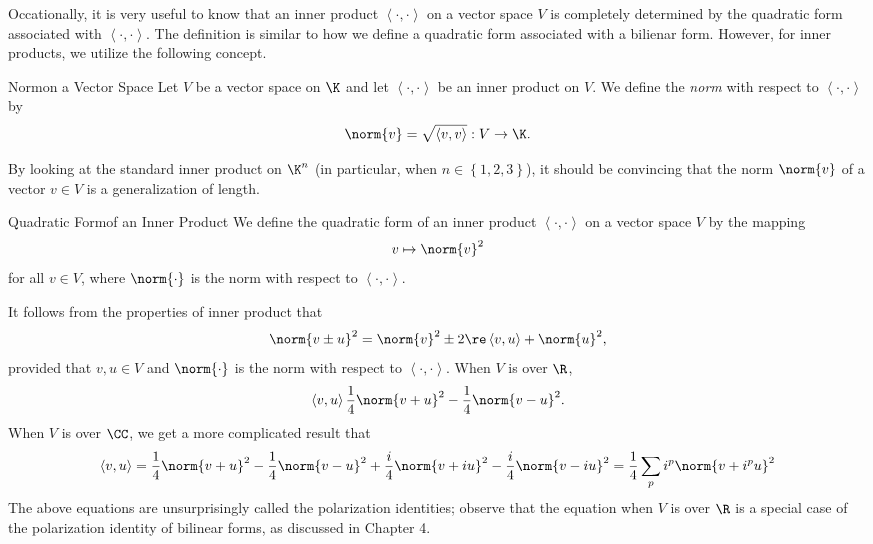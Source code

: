 \documentclass[linearalgebraII]{subfiles}
\begin{document}
    \begin{remark}
        Occationally, it is very useful to know that an inner product $\left\langle \cdot, \cdot\right\rangle$ on a vector space $V$ is completely determined by the quadratic form associated with $\left\langle \cdot, \cdot\right\rangle$. The definition is similar to how we define a quadratic form associated with a bilienar form. However, for inner products, we utilize the following concept.
    \end{remark}

    \begin{definition}{Norm}{on a Vector Space}
        Let $V$ be a vector space on $\K$ and let $\left\langle \cdot, \cdot\right\rangle$ be an inner product on $V$. We define the \emph{norm} with respect to $\left\langle \cdot, \cdot\right\rangle$ by
        \begin{equation*}
            \norm{v} = \sqrt{\left\langle v, v\right\rangle } : V\to \K.
        \end{equation*}
    \end{definition}

    \noindent By looking at the standard inner product on $\K^n$ (in particular, when $n\in\left\lbrace 1,2,3 \right\rbrace$), it should be convincing that the norm $\norm{v}$ of a vector $v\in V$ is a generalization of length.

    \begin{definition}{Quadratic Form}{of an Inner Product}
        We define the quadratic form of an inner product $\left\langle \cdot, \cdot\right\rangle$ on a vector space $V$ by the mapping
        \begin{equation*}
            v\mapsto\norm{v}^2
        \end{equation*}
        for all $v\in V$, where $\norm{\cdot}$ is the norm with respect to $\left\langle \cdot, \cdot\right\rangle$.
    \end{definition}

    \noindent It follows from the properties of inner product that 
    \begin{equation*}
        \norm{v\pm u}^2 = \norm{v}^2\pm 2\re\left\langle v, u\right\rangle + \norm{u}^2,
    \end{equation*}
    provided that $v,u\in V$ and $\norm{\cdot}$ is the norm with respect to $\left\langle \cdot, \cdot\right\rangle$. When $V$ is over $\R$,
    \begin{equation*}
        \left\langle v, u\right\rangle \frac{1}{4}\norm{v+u}^2 - \frac{1}{4}\norm{v-u}^2.
    \end{equation*}
    When $V$ is over $\CC$, we get a more complicated result that
    \begin{equation*}
        \left\langle v, u\right\rangle = \frac{1}{4}\norm{v+u}^2 - \frac{1}{4}\norm{v-u}^2 + \frac{i}{4}\norm{v+iu}^2 - \frac{i}{4}\norm{v-iu}^2 =\frac{1}{4} \sum^{}_{p} i^p\norm{v+i^pu}^2
    \end{equation*}
    The above equations are unsurprisingly called the polarization identities; observe that the equation when $V$ is over $\R$ is a special case of the polarization identity of bilinear forms, as discussed in Chapter 4.
\end{document}
